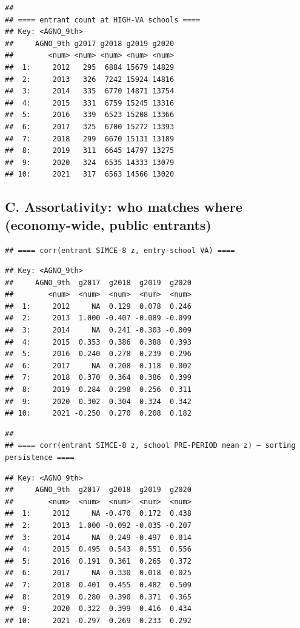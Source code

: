 \documentclass[
]{article}
\begin{document}
\begin{verbatim}
## 
## ==== entrant count at HIGH-VA schools ====
## Key: <AGNO_9th>
##     AGNO_9th g2017 g2018 g2019 g2020
##        <num> <num> <num> <num> <num>
##  1:     2012   295  6884 15679 14829
##  2:     2013   326  7242 15924 14816
##  3:     2014   335  6770 14871 13754
##  4:     2015   331  6759 15245 13316
##  5:     2016   339  6523 15208 13366
##  6:     2017   325  6700 15272 13393
##  7:     2018   299  6670 15131 13189
##  8:     2019   311  6645 14797 13275
##  9:     2020   324  6535 14333 13079
## 10:     2021   317  6563 14566 13020
\end{verbatim}

\hypertarget{c.-assortativity-who-matches-where-economy-wide-public-entrants}{%
\subsection{C. Assortativity: who matches where (economy-wide, public
entrants)}\label{c.-assortativity-who-matches-where-economy-wide-public-entrants}}

\begin{verbatim}
## ==== corr(entrant SIMCE-8 z, entry-school VA) ====
\end{verbatim}

\begin{verbatim}
## Key: <AGNO_9th>
##     AGNO_9th  g2017  g2018  g2019  g2020
##        <num>  <num>  <num>  <num>  <num>
##  1:     2012     NA  0.129  0.078  0.246
##  2:     2013  1.000 -0.407 -0.089 -0.099
##  3:     2014     NA  0.241 -0.303 -0.009
##  4:     2015  0.353  0.386  0.388  0.393
##  5:     2016  0.240  0.278  0.239  0.296
##  6:     2017     NA  0.208  0.118  0.002
##  7:     2018  0.370  0.364  0.386  0.399
##  8:     2019  0.284  0.298  0.256  0.311
##  9:     2020  0.302  0.304  0.324  0.342
## 10:     2021 -0.250  0.270  0.208  0.182
\end{verbatim}

\begin{verbatim}
## 
## ==== corr(entrant SIMCE-8 z, school PRE-PERIOD mean z) — sorting persistence ====
\end{verbatim}

\begin{verbatim}
## Key: <AGNO_9th>
##     AGNO_9th  g2017  g2018  g2019  g2020
##        <num>  <num>  <num>  <num>  <num>
##  1:     2012     NA -0.470  0.172  0.438
##  2:     2013  1.000 -0.092 -0.035 -0.207
##  3:     2014     NA  0.249 -0.497  0.014
##  4:     2015  0.495  0.543  0.551  0.556
##  5:     2016  0.191  0.361  0.265  0.372
##  6:     2017     NA  0.330  0.018  0.025
##  7:     2018  0.401  0.455  0.482  0.509
##  8:     2019  0.280  0.390  0.371  0.365
##  9:     2020  0.322  0.399  0.416  0.434
## 10:     2021 -0.297  0.269  0.233  0.292
\end{verbatim}
\end{document}
